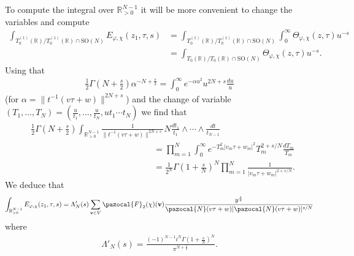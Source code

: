 \documentclass[a4paper,11pt]{amsart} %
\newcommand{\8}{\infty}
\newcommand{\vbf}{\mathbf{v}}
\newcommand{\four}{\pazocal{F}}
\newcommand{\SO}{\mathrm{SO}}
\newcommand{\R}{\mathbb{R}}
\newcommand{\N}{\pazocal{N}}
\theoremstyle{mytheoremstyle}
\theoremstyle{remark}
\numberwithin{equation}{section}
\begin{document}
To compute the integral over $\R_{>0}^{N-1}$ it will be more convenient to change the variables and compute
\begin{align}
\int_{T^{(1)}_0(\R)/T^{(1)}_0(\R) \cap \SO(N)}E_{\varphi, \chi}(z_1,\tau,s) & = \int_{T^{(1)}_0(\R)/T^{(1)}_0(\R) \cap \SO(N)} \int_0^\8 \Theta_{\varphi, \chi}(z,\tau)u^{-s} \nonumber \\
& =   \int_{T_0(\R)/T_0(\R) \cap \SO(N)} \Theta_{\varphi, \chi}(z,\tau)u^{-s}.
\end{align}
Using that 
\begin{align}
\frac{1}{2}\Gamma \left ( N+\frac{s}{2}\right ) \alpha^{-N+\frac{s}{2}}= \int_0^\8 e^{-\alpha u^2} u^{2N+s}\frac{du}{u}
\end{align}
(for $\alpha=\lVert t^{-1} (v\tau+w) \rVert^{2N+s}$) and the change of variable $(T_1, \dots, T_N)=(\frac{u}{t_1}, \dots, \frac{u}{t_N},ut_1\cdots t_N)$ we find that 
\begin{align}
& \frac{1}{2}\Gamma \left ( N+\frac{s}{2}\right )\int_{\R_{>0}^{N-1}}\frac{1}{ \lVert t^{-1} (v\tau+w) \rVert^{2N+s}} N\frac{dt_1}{t_1} \wedge \cdots \wedge \frac{dt}{t_{N-1}} \nonumber \\
& \hspace{6cm} =\prod_{m=1}^N \int_0^\8 e^{-T_m^2 \vert v_m\tau+w_m\vert^2  } T_m^{2+s/N}\frac{dT_m}{T_m} \nonumber \\
& \hspace{6cm} = \frac{1}{2^N} \Gamma\left ( 1 + \frac{s}{N} \right )^N \prod_{m=1}^N \frac{1}{\vert v_m\tau+w_m\vert^{2+s/N}}.
\end{align}
We deduce that
\begin{align}
\int_{\R_{>0}^{N-1}} E_{\varphi, \chi}(z_1,\tau,s)= \Lambda'_N(s) \sum_{\vbf \in V} \four_2(\chi)(\vbf) \frac{y^{\frac{s}{2}}}{ \N(v\tau+w)\lvert \N(v\tau+w)\rvert^{s/N}}
\end{align}
where
\begin{align}
\Lambda'_N(s)=\frac{(-1)^{N-1}i^{N}\Gamma\left ( 1 + \frac{s}{N} \right )^N}{\pi^{N+\frac{s}{2}}}.
\end{align}
\end{document}
